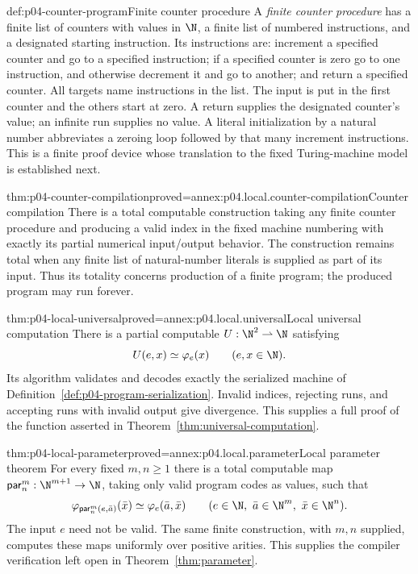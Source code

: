 \begin{hbdefinition}{def:p04-counter-program}{Finite counter procedure}
A \emph{finite counter procedure} has a finite list of counters with values
in \(\N\), a finite list of numbered instructions, and a designated starting
instruction.  Its instructions are: increment a specified counter and go to
a specified instruction; if a specified counter is zero go to one instruction,
and otherwise decrement it and go to another; and return a specified counter.
All targets name instructions in the list.  The input is put in the first
counter and the others start at zero.  A return supplies the designated
counter's value; an infinite run supplies no value.  A literal initialization
by a natural number abbreviates a zeroing loop followed by that many
increment instructions.  This is a finite proof device whose translation
to the fixed Turing-machine model is established next.
\end{hbdefinition}

\begin{hblemma}{thm:p04-counter-compilation}{proved=annex:p04.local.counter-compilation}{Counter compilation}
There is a total computable construction taking any finite counter procedure
and producing a valid index in the fixed machine numbering with exactly its
partial numerical input/output behavior.  The construction remains total
when any finite list of natural-number literals is supplied as part of its
input.  Thus its totality concerns production of a finite program; the
produced program may run forever.
\end{hblemma}

\begin{hbtheorem}{thm:p04-local-universal}{proved=annex:p04.local.universal}{Local universal computation}
There is a partial computable \(U:\N^2\rightharpoonup\N\) satisfying
\[
  U(e,x)\simeq\varphi_e(x)
  \qquad(e,x\in\N).
\]
Its algorithm validates and decodes exactly the serialized machine of
Definition~\ref{def:p04-program-serialization}.  Invalid indices,
rejecting runs, and accepting runs with invalid output give divergence.
This supplies a full proof of the function asserted in
Theorem~\ref{thm:universal-computation}.
\end{hbtheorem}

\begin{hbtheorem}{thm:p04-local-parameter}{proved=annex:p04.local.parameter}{Local parameter theorem}
For every fixed \(m,n\geq1\) there is a total computable map
\(\mathsf{par}_n^m:\N^{m+1}\to\N\), taking only valid program codes
as values, such that
\[
  \varphi_{\mathsf{par}_n^m(e,\bar a)}(\bar x)
  \simeq\varphi_e(\bar a,\bar x)
  \qquad(e\in\N,\ \bar a\in\N^m,\ \bar x\in\N^n).
\]
The input \(e\) need not be valid.  The same finite construction, with
\(m,n\) supplied, computes these maps uniformly over positive arities.
This supplies the compiler verification left open in
Theorem~\ref{thm:parameter}.
\end{hbtheorem}

